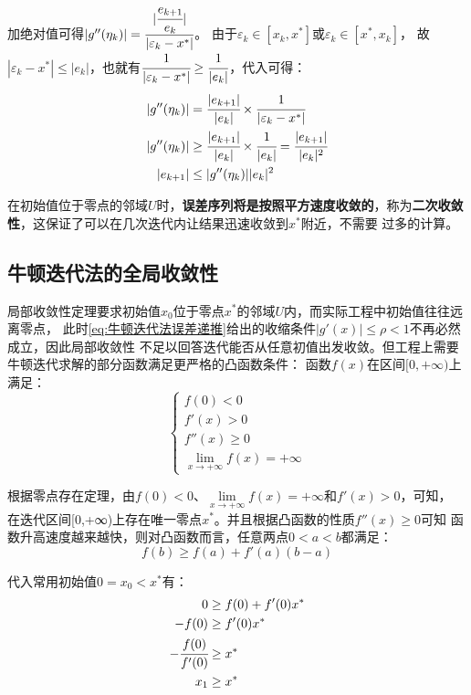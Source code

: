 加绝对值可得\(|g''(\eta_k)|=\cfrac{|\cfrac{e_{k+1}}{e_k}|}{|\varepsilon_k-x^*|}\)。
由于\(\varepsilon_k\in[x_k,x^*]\)或\(\varepsilon_k\in[x^*,x_k]\)，
故\(|\varepsilon_k-x^*|\le|e_k|\)，也就有\(\cfrac{1}{|\varepsilon_k-x^*|}\ge \cfrac{1}{|e_k|}\)，代入可得：
\begin{align*}
    |g''(\eta_k)|&= \cfrac{|e_{k+1}|}{|e_k|}\times\cfrac{1}{|\varepsilon_k-x^*|}\\
    |g''(\eta_k)|&\ge \cfrac{|e_{k+1}|}{|e_k|}\times\cfrac{1}{|e_k|}=\cfrac{|e_{k+1}|}{|e_k|^2}\\
    |e_{k+1}|&\le|g''(\eta_k)||e_k|^2
\end{align*}

在初始值位于零点的邻域\(U\)时，\textbf{误差序列将是按照平方速度收敛的}，称为\textbf{二次收敛性}，这保证了可以在几次迭代内让结果迅速收敛到\(x^*\)附近，不需要
过多的计算。

\subsection{牛顿迭代法的全局收敛性}
局部收敛性定理要求初始值\(x_0\)位于零点\(x^*\)的邻域\(U\)内，而实际工程中初始值往往远离零点，
此时\eqref{eq:牛顿迭代法误差递推}给出的收缩条件\(|g'(x)|\le\rho<1\)不再必然成立，因此局部收敛性
不足以回答迭代能否从任意初值出发收敛。但工程上需要牛顿迭代求解的部分函数满足更严格的凸函数条件：
函数\(f(x)\)在区间\([0,+\infty)\)上满足：
\begin{equation*}
    \begin{cases}
        f(0)<0\\
        f'(x)>0\\
        f''(x)\ge 0\\
        \lim\limits_{x\to+\infty}f(x)=+\infty
    \end{cases}
\end{equation*}

根据零点存在定理，由\(f(0)<0\)、\(\lim\limits_{x\to+\infty}f(x)=+\infty\)和\(f'(x)>0\)，可知，
在迭代区间[0,+∞)上存在唯一零点\(x^*\)。并且根据凸函数的性质\(f''(x)\ge 0\)可知
函数升高速度越来越快，则对凸函数而言，任意两点\(0<a<b\)都满足：
\begin{equation*}
    f(b)\ge f(a)+f'(a)(b-a)
\end{equation*}

代入常用初始值\(0=x_0<x^*\)有：
\begin{align*}
    0&\ge f(0)+f'(0)x^*\\
    -f(0)&\ge f'(0)x^*\\
    -\cfrac{f(0)}{f'(0)}&\ge x^*\\
    x_1&\ge x^*
\end{align*}

